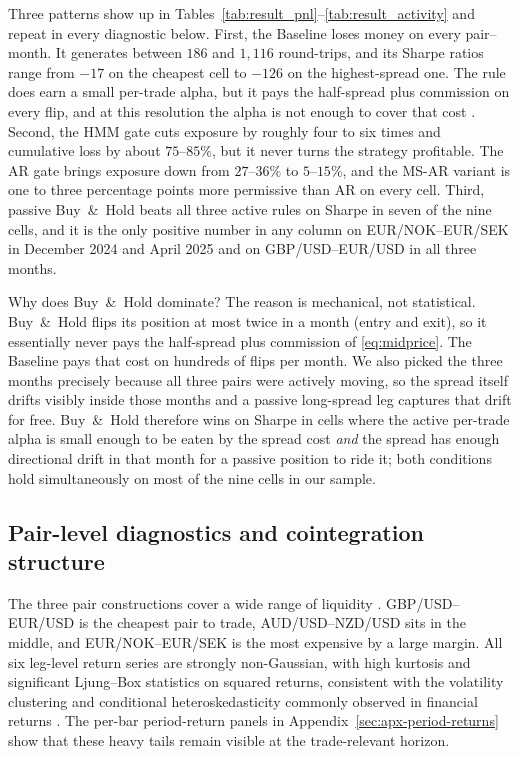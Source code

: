 Three patterns show up in Tables~\ref{tab:result_pnl}--\ref{tab:result_activity} and repeat in every diagnostic below. First, the Baseline loses money on every pair--month. It generates between $186$ and $1{,}116$ round-trips, and its Sharpe ratios range from $-17$ on the cheapest cell to $-126$ on the highest-spread one. The rule does earn a small per-trade alpha, but it pays the half-spread plus commission on every flip, and at this resolution the alpha is not enough to cover that cost \parencite{krauss2017statarb}. Second, the HMM gate cuts exposure by roughly four to six times and cumulative loss by about $75$--$85\%$, but it never turns the strategy profitable. The AR gate brings exposure down from $27$--$36\%$ to $5$--$15\%$, and the MS-AR variant is one to three percentage points more permissive than AR on every cell. Third, passive Buy~\&~Hold beats all three active rules on Sharpe in seven of the nine cells, and it is the only positive number in any column on EUR/NOK--EUR/SEK in December 2024 and April 2025 and on GBP/USD--EUR/USD in all three months.

Why does Buy~\&~Hold dominate? The reason is mechanical, not statistical. Buy~\&~Hold flips its position at most twice in a month (entry and exit), so it essentially never pays the half-spread plus commission of \eqref{eq:midprice}. The Baseline pays that cost on hundreds of flips per month. We also picked the three months precisely because all three pairs were actively moving, so the spread itself drifts visibly inside those months and a passive long-spread leg captures that drift for free. Buy~\&~Hold therefore wins on Sharpe in cells where the active per-trade alpha is small enough to be eaten by the spread cost \emph{and} the spread has enough directional drift in that month for a passive position to ride it; both conditions hold simultaneously on most of the nine cells in our sample.

\subsection{Pair-level diagnostics and cointegration structure}
\label{sec:result-pairdiag}

The three pair constructions cover a wide range of liquidity \parencite{roll1984spread}. GBP/USD--EUR/USD is the cheapest pair to trade, AUD/USD--NZD/USD sits in the middle, and EUR/NOK--EUR/SEK is the most expensive by a large margin. All six leg-level return series are strongly non-Gaussian, with high kurtosis and significant Ljung--Box statistics on squared returns, consistent with the volatility clustering and conditional heteroskedasticity commonly observed in financial returns \parencite{cont2001empirical}. The per-bar period-return panels in Appendix~\ref{sec:apx-period-returns} show that these heavy tails remain visible at the trade-relevant horizon.

